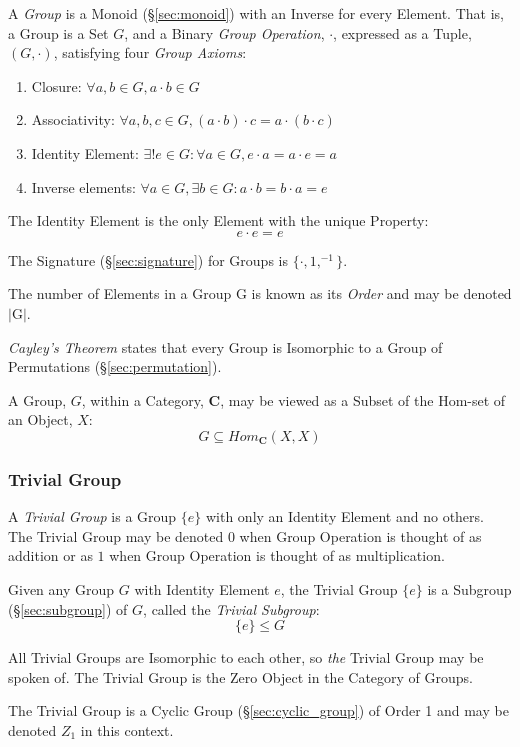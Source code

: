 A \emph{Group} is a Monoid (\S\ref{sec:monoid}) with an Inverse for
every Element. That is, a Group is a Set $G$, and a Binary \emph{Group
  Operation}, $\cdot$, expressed as a Tuple, $(G,\cdot)$, satisfying
four \emph{Group Axioms}:
\begin{enumerate}
    \item Closure: $\forall a,b \in G, a \cdot b \in G$
    \item Associativity: $\forall a,b,c \in G, (a \cdot b) \cdot c = a
      \cdot (b \cdot c)$
    \item Identity Element: $\exists! e \in G : \forall a \in G,
      e \cdot a = a \cdot e = a$
    \item Inverse elements: $\forall a \in G, \exists b \in G :
      a \cdot b = b \cdot a = e$
\end{enumerate}
The Identity Element is the only Element with the unique Property:
\[
    e \cdot e = e
\]

The Signature (\S\ref{sec:signature}) for Groups is $\{\cdot, 1,
^{-1}\}$.

The number of Elements in a Group $\mathrm{G}$ is known as its
\emph{Order} and may be denoted $|\mathrm{G}|$.

\emph{Cayley's Theorem} states that every Group is Isomorphic to a
Group of Permutations (\S\ref{sec:permutation}).

A Group, $G$, within a Category, $\mathbf{C}$, may be viewed as a
Subset of the Hom-set of an Object, $X$:
\[
    G \subseteq Hom_{\mathbf{C}}(X,X)
\]



\subsubsection{Trivial Group}\label{sec:trivial_group}

A \emph{Trivial Group} is a Group $\{e\}$ with only an Identity
Element and no others. The Trivial Group may be denoted $0$ when
Group Operation is thought of as addition or as $1$ when Group
Operation is thought of as multiplication.

Given any Group $G$ with Identity Element $e$, the Trivial Group
$\{e\}$ is a Subgroup (\S\ref{sec:subgroup}) of $G$, called the
\emph{Trivial Subgroup}:
\[
    \{e\} \leq G
\]

All Trivial Groups are Isomorphic to each other, so \emph{the} Trivial
Group may be spoken of. The Trivial Group is the Zero Object in the
Category of Groups.

The Trivial Group is a Cyclic Group (\S\ref{sec:cyclic_group}) of
Order 1 and may be denoted $Z_1$ in this context.



